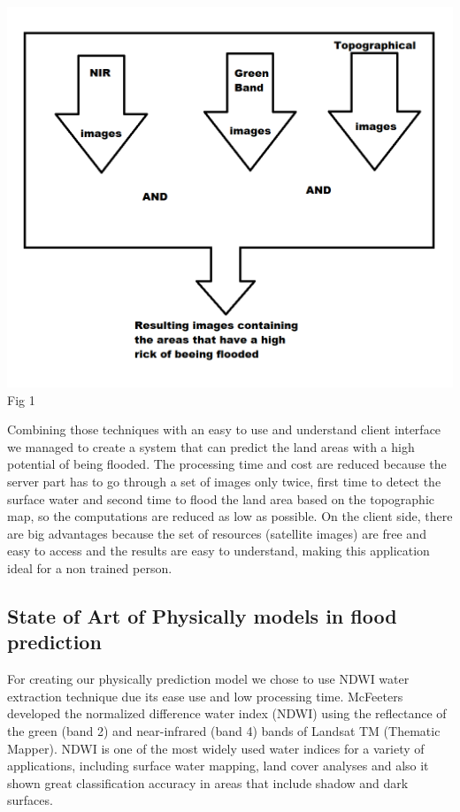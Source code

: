 \documentclass[12pt, a4paper]{report}
\begin{document}
\begin{center}
	\includegraphics[scale=0.6]{application_outline.png} 
	Fig 1
\end{center}

Combining those techniques with an easy to use and understand client interface we managed to create a system that can predict the land areas with a high potential of being flooded. The processing time and cost are reduced because the server part has to go through a set of images only twice, first time to detect the surface water and second time to flood the land area based on the topographic map, so the computations are reduced as low as possible. On the client side, there are big advantages because the set of resources (satellite images) are free and easy to access and the results are easy to understand, making this application ideal for a non trained person.
\par





\subsection{State of Art of Physically models in flood prediction}

\quad
For creating our physically prediction model we chose to use NDWI water extraction technique due its ease use and low processing time. McFeeters \cite{McFeeters} developed the normalized difference water index (NDWI) using the reflectance of the green (band 2) and near-infrared (band 4) bands of Landsat TM (Thematic Mapper). NDWI is one of the most widely used water indices for a variety of applications, including surface water mapping, land cover analyses \cite{Duan, Poulin, Hui} and also it shown great classification accuracy in areas that include shadow and dark surfaces.
\par 
\end{document}
